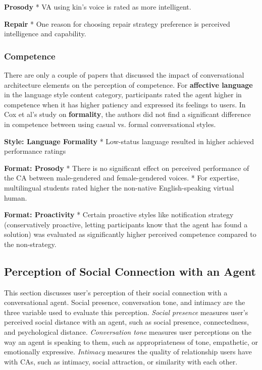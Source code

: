 \documentclass[sigconf,screen,review, anonymous]{acmart}
\newcommand{\cmt}[1]{}%
\begin{document}
\textbf{Prosody}
* VA using kin's voice is rated as more intelligent. \cite{chan2021kinvoices}\cmt{[74]}

\textbf{Repair}
* One reason for choosing repair strategy preference is perceived intelligence and capability. \cite{ashktorab2019resilient}\cmt{[88]}

\subsubsection{Competence}

There are only a couple of papers that discussed the impact of conversational architecture elements on the perception of competence. For \textbf{affective language} in the language style content category, participants rated the agent higher in competence when it has higher patiency and expressed its feelings to users. In Cox et al's study on \textbf{formality}, the authors did not find a significant difference in competence between using casual vs. formal conversational styles.

\textbf{Style: Language Formality}
*  Low-status language resulted in higher achieved performance ratings \cite{habler2019effects}\cmt{[63]}

\textbf{Format: Prosody}
* There is no significant effect on perceived performance of the CA between male-gendered and female-gendered voices. \cite{habler2019effects}\cmt{[63]}
* For expertise, multilingual students rated higher the non-native English-speaking virtual human. \cite{feijoo2021effects}\cmt{[70]}

\textbf{Format: Proactivity}
* Certain proactive styles like notification strategy (conservatively proactive, letting participants know that the agent has found a solution) was evaluated as significantly higher perceived competence compared to the non-strategy. \cite{kraus2020effects}\cmt{[64]}



\subsection{Perception of Social Connection with an Agent}

This section discusses user's perception of their social connection with a conversational agent. Social presence, conversation tone, and intimacy are the three variable used to evaluate this perception. \textit{Social presence} measures user's perceived social distance with an agent, such as social presence, connectedness, and psychological distance. \textit{Conversation tone} measures user perceptions on the way an agent is speaking to them, such as appropriateness of tone, empathetic, or emotionally expressive. \textit{Intimacy} measures the quality of relationship users have with CAs, such as intimacy, social attraction, or similarity with each other.
\end{document}

